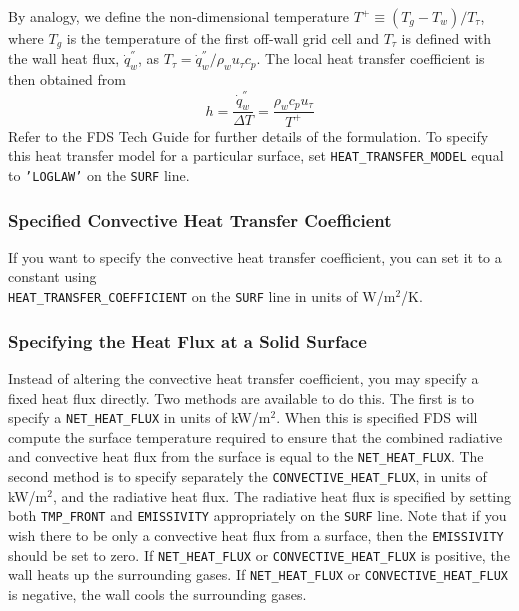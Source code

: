\documentclass[11pt]{book}
\newcommand{\ct}{\tt\small}
\begin{document}
By analogy, we define the non-dimensional temperature $T^+ \equiv (T_g-T_w)/T_\tau$, where $T_g$ is the temperature of the first off-wall grid cell and $T_\tau$ is defined with the wall heat flux, $\dot{q}^{''}_w$, as $T_\tau = \dot{q}^{''}_w/\rho_w u_\tau c_p$. The local heat transfer coefficient is then obtained from
\begin{equation}
h = \frac{\dot{q}^{''}_w}{\Delta T} = \frac{\rho_w c_p u_\tau}{T^+}
\end{equation}
Refer to the FDS Tech Guide \cite{FDS_Tech_Guide} for further details of the formulation. To specify this heat transfer model for a particular
surface, set {\ct HEAT\_TRANSFER\_MODEL} equal to {\ct 'LOGLAW'} on the {\ct SURF} line.

\subsubsection{Specified Convective Heat Transfer Coefficient}

If you want to specify the convective heat transfer coefficient, you can set it to a constant using \\
{\ct HEAT\_TRANSFER\_COEFFICIENT} on the {\ct SURF} line in units of W/m$^2$/K.

\subsubsection{Specifying the Heat Flux at a Solid Surface}

Instead of altering the convective heat transfer coefficient, you may specify
a fixed heat flux directly.  Two methods are available to do this.  The first is to specify a
{\ct NET\_HEAT\_FLUX} in units of kW/m$^2$.  When this is specified FDS will compute the surface
temperature required to
ensure that the combined radiative and convective heat flux from the surface is equal to the
{\ct NET\_HEAT\_FLUX}.  The second method is to specify separately the {\ct CONVECTIVE\_HEAT\_FLUX},
in units of kW/m$^2$, and the radiative heat flux.  The radiative heat flux is specified  by setting both
{\ct TMP\_FRONT} and {\ct EMISSIVITY} appropriately on the {\ct SURF} line. Note that if you wish there to be only a convective heat flux from a
surface, then the {\ct EMISSIVITY} should be set to zero.  If {\ct NET\_HEAT\_FLUX} or
{\ct CONVECTIVE\_HEAT\_FLUX} is positive, the wall heats up the surrounding gases. If {\ct NET\_HEAT\_FLUX} or
{\ct CONVECTIVE\_HEAT\_FLUX} is negative, the wall cools the surrounding gases.
\end{document}
